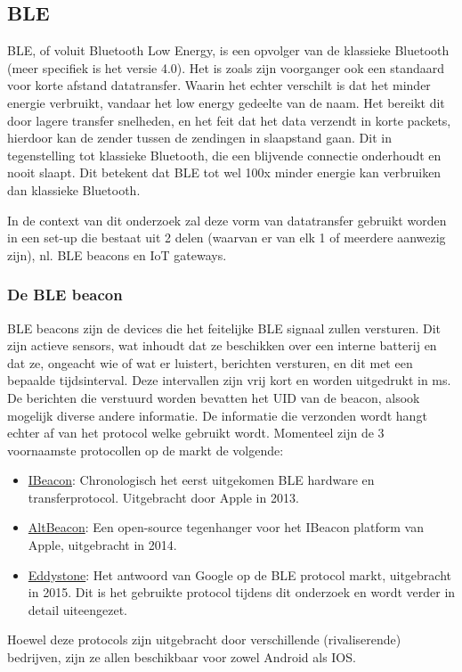 \subsection{BLE}
\label{subsec:lit-ble}
BLE, of voluit Bluetooth Low Energy, is een opvolger van de klassieke Bluetooth (meer specifiek is het versie 4.0). Het is zoals zijn voorganger ook een standaard voor korte afstand datatransfer. Waarin het echter verschilt is dat het minder energie verbruikt, vandaar het low energy gedeelte van de naam. Het bereikt dit door lagere transfer snelheden, en het feit dat het data verzendt in korte packets, hierdoor kan de zender tussen de zendingen in slaapstand gaan. Dit in tegenstelling tot klassieke Bluetooth, die een blijvende connectie onderhoudt en nooit slaapt. Dit betekent dat BLE tot wel 100x minder energie kan verbruiken dan klassieke Bluetooth. \autocite{Nesbo2021}

In de context van dit onderzoek zal deze vorm van datatransfer gebruikt worden in een set-up die bestaat uit 2 delen (waarvan er van elk 1 of meerdere aanwezig zijn), nl. BLE beacons en IoT gateways.

\subsubsection{De BLE beacon}
BLE beacons zijn de devices die het feitelijke BLE signaal zullen versturen. Dit zijn actieve sensors, wat inhoudt dat ze beschikken over een interne batterij en dat ze, ongeacht wie of wat er luistert, berichten versturen, en dit met een bepaalde tijdsinterval. Deze intervallen zijn vrij kort en worden uitgedrukt in ms.\autocite{Adarsh2022}
De berichten die verstuurd worden bevatten het UID van de beacon, alsook mogelijk diverse andere informatie. De informatie die verzonden wordt hangt echter af van het protocol welke gebruikt wordt. Momenteel zijn de 3 voornaamste protocollen op de markt de volgende:
\begin{itemize}
	\item \underline{IBeacon}:
	Chronologisch het eerst uitgekomen BLE hardware en transferprotocol. Uitgebracht door Apple in 2013. 
	\item \underline{AltBeacon}:
	Een open-source tegenhanger voor het IBeacon platform van Apple, uitgebracht in 2014.
	\item \underline{Eddystone}:
	Het antwoord van Google op de BLE protocol markt, uitgebracht in 2015. Dit is het gebruikte protocol tijdens dit onderzoek en wordt verder in detail uiteengezet.
\end{itemize}
Hoewel deze protocols zijn uitgebracht door verschillende (rivaliserende) bedrijven, zijn ze allen beschikbaar voor zowel Android als IOS.\autocite{Smart2022}

